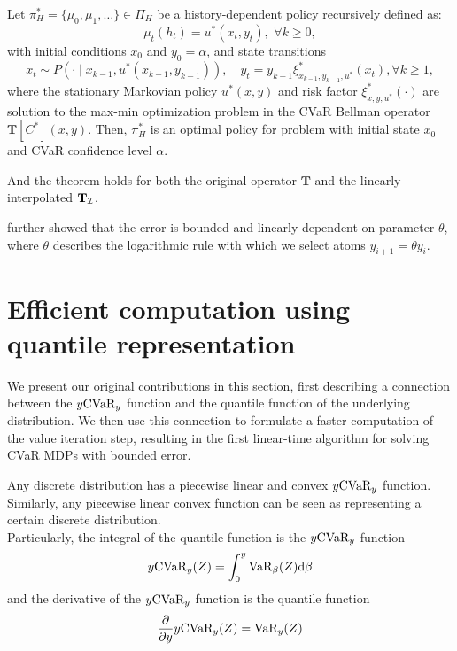 \begin{theorem}\label{thm:optimalpolicy}
Let $\pi_H^*=\{\mu_0,\mu_1,\ldots\}\in\Pi_H$ be a history-dependent policy recursively defined as:
\begin{equation}\label{eqn:policy_construct}
\mu_t(h_t) = u^*(x_t, y_t),\,\,\forall k\geq 0,
\end{equation}
with initial conditions $x_0$ and $y_0=\alpha$, and state transitions
\begin{equation}\label{eqn:opt_state}
x_t\sim P(\cdot\mid x_{k-1},u^*(x_{k-1},y_{k-1})),\quad y_t = y_{k-1}\xi_{x_{k-1},y_{k-1},u^*}^*(x_t), \forall k\geq 1,
\end{equation}
where the stationary Markovian policy $u^*(x,y)$ and risk factor $\xi_{x,y,u^*}^*(\cdot)$ are solution to the  max-min optimization problem in the CVaR Bellman operator $\mathbf T[C^*](x,y)$.
Then, $\pi^*_H$ is an optimal policy for problem  with initial state $x_0$ and CVaR confidence level $\alpha$.
\end{theorem}

And the theorem holds for both the original operator $\mathbf{T}$ and the linearly interpolated $\mathbf{T}_{\mathcal{I}}$.

\citet{chow2015risk} further showed that the error is bounded and linearly dependent on parameter $\theta$, where $\theta$ describes the logarithmic rule with which we select atoms $y_{i+1}=\theta y_i$.


\section{Efficient computation using quantile representation}\label{sec:vi:linear}

We present our original contributions in this section, first describing a connection between the $y\text{CVaR}_y$ function and the quantile function of the underlying distribution. We then use this connection to formulate a faster computation of the value iteration step, resulting in the first linear-time algorithm for solving CVaR MDPs with bounded error.

\begin{lemma}\label{thm:varcvarconnection}
Any discrete distribution has a piecewise linear and convex $y\text{CVaR}_y$ function. Similarly, any piecewise linear convex function can be seen as representing a certain discrete distribution.
\\
Particularly, the integral of the quantile function is the $y\text{CVaR}_y$ function
\begin{equation}\label{eqn:varcvarintegration}
y\text{CVaR}_y(Z) = \int_0^y \text{VaR}_\beta(Z) \text{d} \beta
\end{equation}
and the derivative of the $y\text{CVaR}_y$ function is the quantile function
\begin{equation}\label{eqn:varcvarderivation}
\dfrac{\partial}{\partial y} y \text{CVaR}_y(Z) = \text{VaR}_y(Z)
\end{equation}
\end{lemma}

